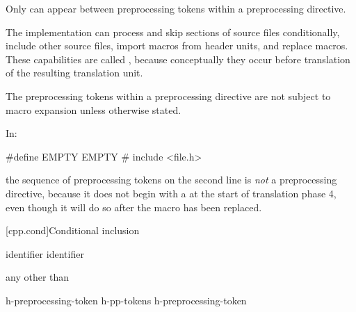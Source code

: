 \documentclass{wg21}
\begin{document}
\begin{addedblock}
Only  can appear between preprocessing tokens within a preprocessing directive.
\end{addedblock}


\pnum
The implementation can
process and skip sections of source files conditionally,
include other source files,
import macros from header units,
and replace macros.
These capabilities are called
,
because conceptually they occur
before translation of the resulting translation unit.

\pnum
The preprocessing tokens within a preprocessing directive
are not subject to macro expansion unless otherwise stated.

\begin{example}
    In:
    \begin{codeblock}
        #define EMPTY
        EMPTY   #   include <file.h>
    \end{codeblock}
    the sequence of preprocessing tokens on the second line is \textit{not}
    a preprocessing directive, because it does not begin with a \tcode{\#} at the start of
    translation phase 4, even though it will do so after the macro 
    has been replaced.
\end{example}

[cpp.cond]{Conditional inclusion}%
%

%
\begin{bnf}
    \br
     identifier\br
     identifier \terminal{)}
\end{bnf}

\begin{bnf}
    \br
    \textnormal{any  other than \terminal{>}}
\end{bnf}

\begin{bnf}
    \br
    h-preprocessing-token\br
    h-pp-tokens h-preprocessing-token
\end{bnf}
\end{document}
